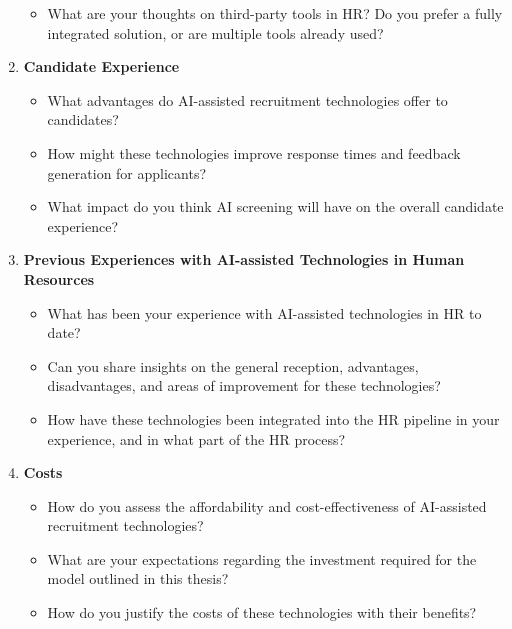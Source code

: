 \documentclass[draft,final]{thesisclass} %
\begin{document}
\begin{enumerate}
\begin{itemize}
        \item What are your thoughts on third-party tools in HR? Do you prefer a fully integrated solution, or are multiple tools already used?
    \end{itemize}
    \item \textbf{Candidate Experience}
    \begin{itemize}
        \item What advantages do \acs{AI}-assisted recruitment technologies offer to candidates?
        \item How might these technologies improve response times and feedback generation for applicants?
        \item What impact do you think \acs{AI} screening will have on the overall candidate experience?
    \end{itemize}
    \item \textbf{Previous Experiences with \acs{AI}-assisted Technologies in Human Resources}
    \begin{itemize}
        \item What has been your experience with \acs{AI}-assisted technologies in \acs{HR} to date?
        \item Can you share insights on the general reception, advantages, disadvantages, and areas of improvement for these technologies?
        \item How have these technologies been integrated into the \acs{HR} pipeline in your experience, and in what part of the \acs{HR} process?
    \end{itemize}
    \item \textbf{Costs}
    \begin{itemize}
        \item How do you assess the affordability and cost-effectiveness of \acs{AI}-assisted recruitment technologies?
        \item What are your expectations regarding the investment required for the model outlined in this thesis?
        \item How do you justify the costs of these technologies with their benefits?
    \end{itemize}
\end{enumerate}
\end{document}
